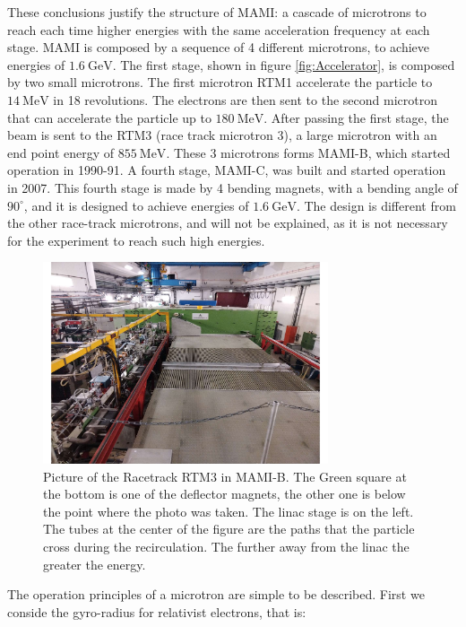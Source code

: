 These conclusions justify the structure of MAMI: a cascade of microtrons to reach each time higher energies with the same acceleration frequency at each stage. \medskip
MAMI is composed by a sequence of 4 different microtrons, to achieve energies of $\SI{1.6}{\giga \electronvolt}$. The first stage, shown in figure \ref{fig:Accelerator}, is composed by two small microtrons. The first microtron RTM1 accelerate the particle to $\SI{14}{\mega \electronvolt}$ in 18 revolutions. The electrons are then sent to the second microtron that can accelerate the particle up to $\SI{180}{\mega \electronvolt}$. After passing the first stage, the beam is sent to the RTM3 (race track microtron 3), a large microtron with an end point energy of $\SI{855}{\mega \electronvolt}$. These 3 microtrons forms MAMI-B, which started operation in 1990-91. A fourth stage, MAMI-C, was built and started operation in 2007. This fourth stage is made by 4 bending magnets, with a bending angle of $90^{\circ}$, and it is designed to achieve energies of $\SI{1.6}{\giga \electronvolt}$. The design is different from the other race-track microtrons, and will not be explained, as it is not necessary for the experiment to reach such high energies.

\begin{figure}[hbtp]
\centering
\includegraphics[width=0.75\textwidth]{ExperimentalSetup/Racetrack.pdf}
\caption{Picture of the Racetrack RTM3 in MAMI-B. The Green square at the bottom is one of the deflector magnets, the other one is below the point where the photo was taken. The linac stage is on the left. The tubes at the center of the figure are the paths that the particle cross during the recirculation. The further away from the linac the greater the energy.}
\end{figure}

The operation principles of a microtron are simple to be described. First we conside the gyro-radius for relativist electrons, that is:

